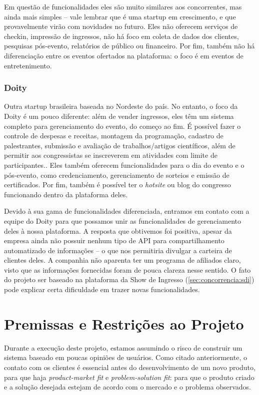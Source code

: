 \documentclass[12pt,a4paper,twoside,hyphens,english,brazil]{abntex2}
\begin{document}
Em questão de funcionalidades eles são muito similares aos concorrentes, mas ainda mais simples -- vale lembrar que é uma startup em crescimento, e que provavelmente virão com novidades no futuro. Eles não oferecem serviços de checkin, impressão de ingressos,  não há foco em coleta de dados dos clientes, pesquisas pós-evento, relatórios de público ou financeiro. Por fim, também não há diferenciação entre os eventos ofertados na plataforma: o foco é em eventos de entretenimento.

\subsubsection*{Doity}
Outra startup brasileira baseada no Nordeste do país. No entanto, o foco da Doity é um pouco diferente: além de vender ingressos, eles têm um sistema completo para gerenciamento do evento, do começo ao fim. É possível fazer o controle de despesas e receitas, montagem da programação, cadastro de palestrantes, submissão e avaliação de trabalhos/artigos científicos, além de permitir aos congressistas se inscreverem em atividades com limite de participantes.\cite{doity-como-funciona}. Eles também oferecem funcionalidades para o dia do evento e o pós-evento, como credenciamento, gerenciamento de sorteios e emissão de certificados. Por fim, também é possível ter o \emph{hotsite} ou blog do congresso funcionando dentro da plataforma deles.

Devido à sua gama de funcionalidades diferenciada, entramos em contato com a equipe do Doity para que possamos unir as funcionalidades de gerenciamento deles à nossa plataforma. A resposta que obtivemos foi positiva, apesar da empresa ainda não possuir nenhum tipo de API para compartilhamento automatizado de informações -- o que nos permitiria divulgar a carteira de clientes deles. A companhia não aparenta ter um programa de afiliados claro, visto que as informações fornecidas foram de pouca clareza nesse sentido. O fato do projeto ser baseado na plataforma da Show de Ingresso (\autoref{sec:concorrencia:sdi}) pode explicar certa dificuldade em trazer novas funcionalidades.


\section{Premissas e Restrições ao Projeto} \label{sec:premissas}

Durante a execução deste projeto, estamos assumindo o risco de construir um sistema baseado em poucas opiniões de usuários. Como citado anteriormente, o contato com os clientes é essencial antes do desenvolvimento de um novo produto, para que haja \emph{product-market fit} e \emph{problem-solution fit}: para que o produto criado e a solução desejada estejam de acordo com o mercado e o problema observados.\cite{bootstrapping}
\end{document}
